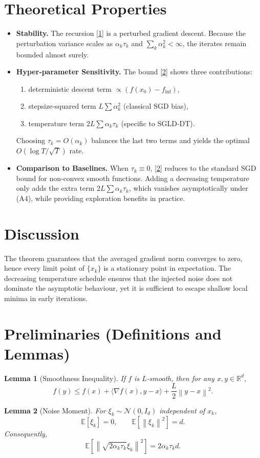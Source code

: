 \documentclass{article}
\newtheorem{lemma}{Lemma}
\newcommand{\E}{\mathbb{E}}
\newcommand{\R}{\mathbb{R}}
\newcommand{\norm}[1]{\left\|#1\right\|}
\newcommand{\iprod}[2]{\langle #1,#2\rangle}
\begin{document}
\section*{Theoretical Properties}
\begin{itemize}
\item \textbf{Stability.} The recursion \eqref{1} is a perturbed gradient descent.
Because the perturbation variance scales as $\alpha_{k}\tau_{k}$ and
$\sum_{k}\alpha_{k}^{2}<\infty$, the iterates remain bounded almost surely.
\item \textbf{Hyper‑parameter Sensitivity.}
The bound \eqref{2} shows three contributions:
\begin{enumerate}
\item deterministic descent term $\propto (f(x_{0})-f_{\inf})$,
\item stepsize‑squared term $L\sum\alpha_{k}^{2}$ (classical SGD bias),
\item temperature term $2L\sum\alpha_{k}\tau_{k}$ (specific to SGLD‑DT).
\end{enumerate}
Choosing $\tau_{k}=O(\alpha_{k})$ balances the last two terms and yields the
optimal $O(\log T/\sqrt{T})$ rate.
\item \textbf{Comparison to Baselines.}
When $\tau_{k}\equiv0$, \eqref{2} reduces to the standard SGD bound for
non‑convex smooth functions. Adding a decreasing temperature only adds the
extra term $2L\sum\alpha_{k}\tau_{k}$, which vanishes asymptotically under
(A4), while providing exploration benefits in practice.
\end{itemize}

\section*{Discussion}
The theorem guarantees that the averaged gradient norm converges to zero,
hence every limit point of $\{x_{k}\}$ is a stationary point in expectation.
The decreasing temperature schedule ensures that the injected noise does not
dominate the asymptotic behaviour, yet it is sufficient to escape shallow
local minima in early iterations.

\newpage

\section*{Preliminaries (Definitions and Lemmas)}
\begin{lemma}[Smoothness Inequality]\label{lem:smooth}
If $f$ is $L$‑smooth, then for any $x,y\in\R^{d}$,
\[
f(y)\le f(x)+\iprod{\nabla f(x)}{y-x}+\frac{L}{2}\norm{y-x}^{2}.
\tag{L1}
\]
\end{lemma}
\begin{lemma}[Noise Moment]\label{lem:noise}
For $\xi_{k}\sim\mathcal N(0,I_{d})$ independent of $x_{k}$,
\[
\E\!\left[\xi_{k}\right]=0,\qquad
\E\!\left[\norm{\xi_{k}}^{2}\right]=d.
\tag{L2}
\]
Consequently,
\[
\E\!\left[\norm{\sqrt{2\alpha_{k}\tau_{k}}\xi_{k}}^{2}\right]
=2\alpha_{k}\tau_{k}d.
\tag{L3}
\]
\end{lemma}
\end{document}
